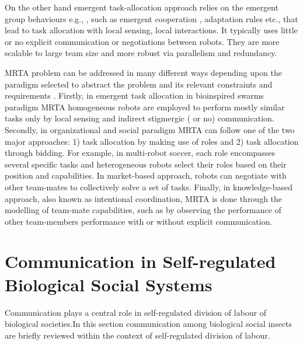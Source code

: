 On the other hand emergent task-allocation approach relies on the emergent group behaviours e.g., \cite{Kube+1993}, such as emergent cooperation \cite{Lerman+2006}, adaptation rules \cite{Liu+2007} etc., that lead to task allocation with local sensing, local interactions. It typically uses little or no explicit communication or negotiations between robots. They are more scalable to large team size and more robust via parallelism and redundancy.

MRTA problem can be addressed in many different ways depending upon the paradigm selected to abstract the problem and its relevant constraints and requirements \cite{Parker2008}. Firstly, in emergent task allocation in bioinspired swarms paradigm MRTA homogeneous robots are employed to perform mostly similar tasks only by local sensing and indirect stigmergic ( or no) communication. Secondly, in organizational and social paradigm MRTA can follow one of the two major approaches: 1) task allocation by making use of roles and 2) task allocation through bidding. For example, in multi-robot soccer, each role encompasses several specific tasks and heterogeneous robots select their roles based on their position and capabilities. In market-based approach, robots can negotiate with other team-mates to collectively solve a set of tasks. Finally, in knowledge-based approach, also known as intentional coordination, MRTA is done through the modelling of team-mate capabilities, such as by observing the performance of other team-members performance with or without explicit communication.
\section{Communication in Self-regulated Biological Social Systems}
Communication plays a central role in self-regulated division of labour of biological societies.In this section communication among biological social insects are briefly reviewed within the context of self-regulated  division of labour.

